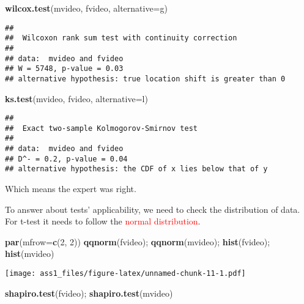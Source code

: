 \documentclass[
]{article}
\newenvironment{Shaded}{\begin{snugshade}}{\end{snugshade}}
\newcommand{\AttributeTok}[1]{\textcolor[rgb]{0.13,0.29,0.53}{#1}}
\newcommand{\DecValTok}[1]{\textcolor[rgb]{0.00,0.00,0.81}{#1}}
\newcommand{\FunctionTok}[1]{\textcolor[rgb]{0.13,0.29,0.53}{\textbf{#1}}}
\newcommand{\NormalTok}[1]{#1}
\newcommand{\StringTok}[1]{\textcolor[rgb]{0.31,0.60,0.02}{#1}}
\begin{document}
\begin{Shaded}
\begin{Highlighting}[]
\FunctionTok{wilcox.test}\NormalTok{(mvideo, fvideo, }\AttributeTok{alternative=}\StringTok{\textquotesingle{}g\textquotesingle{}}\NormalTok{)}
\end{Highlighting}
\end{Shaded}

\begin{verbatim}
## 
##  Wilcoxon rank sum test with continuity correction
## 
## data:  mvideo and fvideo
## W = 5748, p-value = 0.03
## alternative hypothesis: true location shift is greater than 0
\end{verbatim}

\begin{Shaded}
\begin{Highlighting}[]
\FunctionTok{ks.test}\NormalTok{(mvideo, fvideo, }\AttributeTok{alternative=}\StringTok{\textquotesingle{}l\textquotesingle{}}\NormalTok{)}
\end{Highlighting}
\end{Shaded}

\begin{verbatim}
## 
##  Exact two-sample Kolmogorov-Smirnov test
## 
## data:  mvideo and fvideo
## D^- = 0.2, p-value = 0.04
## alternative hypothesis: the CDF of x lies below that of y
\end{verbatim}

Which means the expert was right.

To answer about tests' applicability, we need to check the distribution
of data. For t-test it needs to follow the \textcolor{red}{normal
distribution}.

\begin{Shaded}
\begin{Highlighting}[]
\FunctionTok{par}\NormalTok{(}\AttributeTok{mfrow=}\FunctionTok{c}\NormalTok{(}\DecValTok{2}\NormalTok{, }\DecValTok{2}\NormalTok{))}
\FunctionTok{qqnorm}\NormalTok{(fvideo); }\FunctionTok{qqnorm}\NormalTok{(mvideo); }\FunctionTok{hist}\NormalTok{(fvideo); }\FunctionTok{hist}\NormalTok{(mvideo)}
\end{Highlighting}
\end{Shaded}

\texttt{[image: ass1\_files/figure-latex/unnamed-chunk-11-1.pdf]}

\begin{Shaded}
\begin{Highlighting}[]
\FunctionTok{shapiro.test}\NormalTok{(fvideo); }\FunctionTok{shapiro.test}\NormalTok{(mvideo)}
\end{Highlighting}
\end{Shaded}
\end{document}
